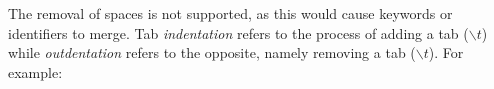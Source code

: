 \documentclass[%
class=scrreprt,
chapterprefix=false,%
open=right,%
twoside=false,%
paper=a4,%
logofile={Logo\_zentral\_farbig\_EN.png},%
thesistype=master,%
UKenglish,%
]{se2thesis}
\theoremstyle{definition}
\begin{document}
	
	The removal of spaces is not supported, as this would cause keywords or identifiers to merge.
	Tab \textit{indentation} refers to the process of adding a tab ($\backslash t$) while \textit{outdentation} refers to the opposite, namely removing a tab ($\backslash t$). 
	For example:
\end{document}
